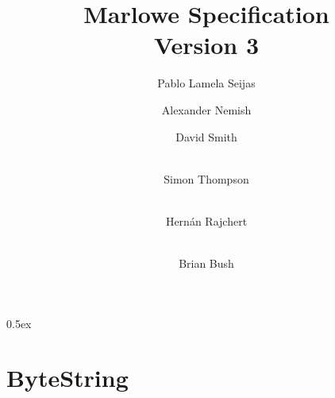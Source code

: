 \documentclass[12pt,a4paper]{report}
\begin{document}
\title{
    \Huge{\textbf{Marlowe Specification}} \\
    \LARGE{Version 3}
}

\author{
Pablo {Lamela Seijas} \and
Alexander Nemish \and
David Smith \and \\
Simon Thompson \and \\
Hernán Rajchert \and \\
Brian Bush
}
\maketitle

\tableofcontents

\parindent 0pt\parskip 0.5ex

% 






% 
% 
% 

\appendix

\chapter{ByteString}

%
%
\end{document}
